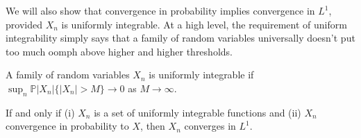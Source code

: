     We will also show that convergence in probability implies convergence in $L^1$, provided 
    $X_n$ is uniformly integrable. At a high level, the requirement of uniform integrability 
    simply says that a family of random variables universally doesn't put too much oomph above 
    higher and higher thresholds.

    \begin{definition}
        A family of random variables $X_n$ is uniformly integrable if 
        $\sup_n \mathbb P|X_n|\{|X_n| > M\} \to 0$ as $M \to \infty$. 
    \end{definition}


    \begin{theorem}
        If and only if (i) $X_n$ is a set of uniformly integrable functions 
        and (ii) $X_n$ convergence in probability to $X$, then $X_n$ converges in $L^1$.
    \end{theorem}
